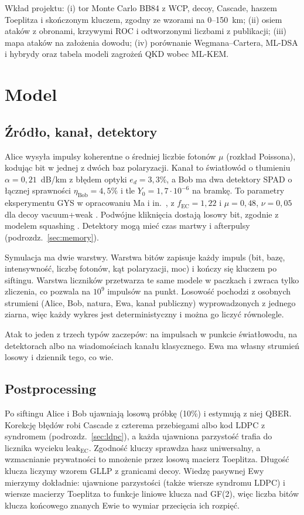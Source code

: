 \documentclass[11pt,a4paper]{article}
\begin{document}
Wkład projektu:
(i) tor Monte Carlo BB84 z WCP, decoy, Cascade, haszem Toeplitza i skończonym kluczem, zgodny ze wzorami na 0--150~km;
(ii) osiem ataków z obronami, krzywymi ROC i odtworzonymi liczbami z publikacji;
(iii) mapa ataków na założenia dowodu;
(iv) porównanie Wegmana--Cartera, ML-DSA i hybrydy oraz tabela modeli zagrożeń QKD wobec ML-KEM.

\section{Model}

\subsection{Źródło, kanał, detektory}

Alice wysyła impulsy koherentne o średniej liczbie fotonów $\mu$ (rozkład Poissona), kodując bit w jednej z dwóch baz polaryzacji. Kanał to światłowód o tłumieniu $\alpha = 0{,}21$~dB/km z błędem optyki $e_d = 3{,}3\%$, a Bob ma dwa detektory SPAD o łącznej sprawności $\eta_{\mathrm{Bob}} = 4{,}5\%$ i tle $Y_0 = 1{,}7\cdot 10^{-6}$ na bramkę. To parametry eksperymentu GYS \cite{gobby2004qkd} w opracowaniu Ma i in.\ \cite{ma2005practical}, z $f_{\mathrm{EC}} = 1{,}22$ i $\mu = 0{,}48$, $\nu = 0{,}05$ dla decoy vacuum+weak \cite{lo2005decoy}. Podwójne kliknięcia dostają losowy bit, zgodnie z modelem squashing \cite{beaudry2008squashing}. Detektory mogą mieć czas martwy i afterpulsy (podrozdz.~\ref{sec:memory}).

Symulacja ma dwie warstwy. Warstwa bitów zapisuje każdy impuls (bit, bazę, intensywność, liczbę fotonów, kąt polaryzacji, moc) i kończy się kluczem po siftingu. Warstwa liczników przetwarza te same modele w paczkach i zwraca tylko zliczenia, co pozwala na $10^9$ impulsów na punkt. Losowość pochodzi z osobnych strumieni (Alice, Bob, natura, Ewa, kanał publiczny) wyprowadzonych z jednego ziarna, więc każdy wykres jest deterministyczny i można go liczyć równolegle.

Atak to jeden z trzech typów zaczepów: na impulsach w punkcie światłowodu, na detektorach albo na wiadomościach kanału klasycznego. Ewa ma własny strumień losowy i dziennik tego, co wie.

\subsection{Postprocessing}

Po siftingu Alice i Bob ujawniają losową próbkę (10\%) i estymują z niej QBER. Korekcję błędów robi Cascade z czterema przebiegami \cite{brassard1994cascade,martinezmateo2015cascade} albo kod LDPC z syndromem (podrozdz.~\ref{sec:ldpc}), a każda ujawniona parzystość trafia do licznika wycieku $\mathrm{leak}_{\mathrm{EC}}$. Zgodność kluczy sprawdza hasz uniwersalny, a wzmacnianie prywatności to mnożenie przez losową macierz Toeplitza. Długość klucza liczymy wzorem GLLP z granicami decoy. Wiedzę pasywnej Ewy mierzymy dokładnie: ujawnione parzystości (także wiersze syndromu LDPC) i wiersze macierzy Toeplitza to funkcje liniowe klucza nad GF(2), więc liczba bitów klucza końcowego znanych Ewie to wymiar przecięcia ich rozpięć.
\end{document}
